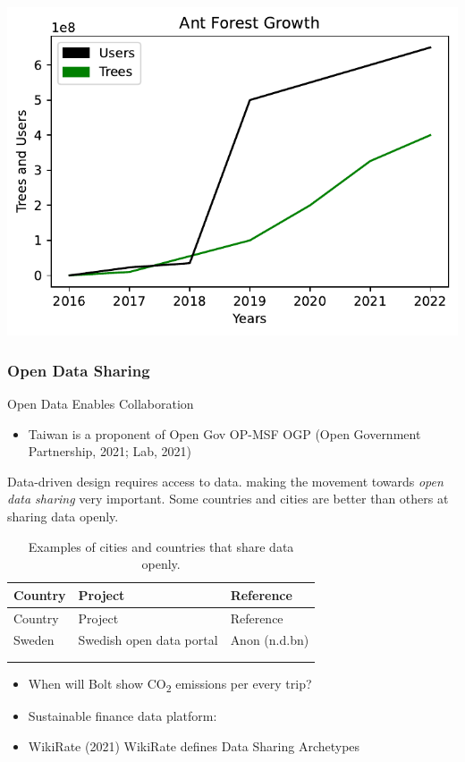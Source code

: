 \documentclass[
  letterpaper,
  DIV=11,
  numbers=noendperiod]{scrartcl}
\providecommand{\tightlist}{%
  \setlength{\itemsep}{0pt}\setlength{\parskip}{0pt}}\usepackage{longtable,booktabs,array}
\begin{document}
\includegraphics{_thesis_files/figure-pdf/cell-26-output-1.pdf}

\subsubsection{Open Data Sharing}\label{open-data-sharing}

Open Data Enables Collaboration

\begin{itemize}
\tightlist
\item
  Taiwan is a proponent of Open Gov OP-MSF OGP (Open Government
  Partnership, 2021; Lab, 2021)
\end{itemize}

Data-driven design requires access to data. making the movement towards
\emph{open data sharing} very important. Some countries and cities are
better than others at sharing data openly.

\begin{longtable}[]{@{}lll@{}}
\caption{Examples of cities and countries that share data
openly.}\tabularnewline
\toprule\noalign{}
Country & Project & Reference \\
\midrule\noalign{}
\endfirsthead
\toprule\noalign{}
Country & Project & Reference \\
\midrule\noalign{}
\endhead
\bottomrule\noalign{}
\endlastfoot
Sweden & Swedish open data portal & Anon (n.d.bn) \\
& & \\
& & \\
\end{longtable}

\begin{itemize}
\tightlist
\item
  When will Bolt show CO\textsubscript{2} emissions per every trip?
\item
  Sustainable finance data platform:
\item
  WikiRate (2021) WikiRate defines Data Sharing Archetypes
\end{itemize}
\end{document}
